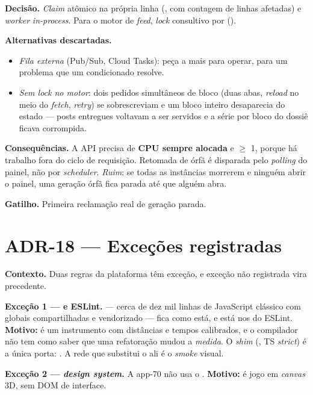 \textbf{Decisão.} \emph{Claim} atômico na própria linha
(, com contagem de linhas afetadas) e
\emph{worker} \emph{in-process}. Para o motor de \emph{feed}, \emph{lock}
consultivo por  ().

\textbf{Alternativas descartadas.}
\begin{itemize}
  \item \emph{Fila externa} (Pub/Sub, Cloud Tasks): peça a mais para operar, para
    um problema que um  condicionado resolve.
  \item \emph{Sem \emph{lock} no motor}: dois pedidos simultâneos de bloco (duas
    abas, \emph{reload} no meio do \emph{fetch}, \emph{retry}) se sobrescreviam e
    um bloco inteiro desaparecia do estado --- posts entregues voltavam a ser
    servidos e a série por bloco do dossiê ficava corrompida.
\end{itemize}

\textbf{Consequências.} A API precisa de \textbf{CPU sempre alocada} e
 $\geq$ 1, porque há trabalho fora do ciclo de requisição.
Retomada de órfã é disparada pelo \emph{polling} do painel, não por
\emph{scheduler}. \emph{Ruim}: se todas as instâncias morrerem e ninguém abrir o
painel, uma geração órfã fica parada até que alguém abra.

\textbf{Gatilho.} Primeira reclamação real de geração parada.

\section{ADR-18 --- Exceções registradas}

\textbf{Contexto.} Duas regras da plataforma têm exceção, e exceção não
registrada vira precedente.

\textbf{Exceção 1 ---  e ESLint.}
 --- cerca de dez mil
linhas de JavaScript clássico com globais compartilhadas e 
vendorizado --- fica como está, e está nos  do ESLint.
\textbf{Motivo:} é um instrumento com distâncias e tempos calibrados, e o
compilador não tem como saber que uma refatoração mudou a \emph{medida}. O
\emph{shim} (, TS \emph{strict}) é a única porta: . A
rede que substitui o  ali é o \emph{smoke} visual.

\textbf{Exceção 2 --- \emph{design system}.} A app-70 não usa o
. \textbf{Motivo:} é jogo em \emph{canvas} 3D, sem DOM
de interface.

